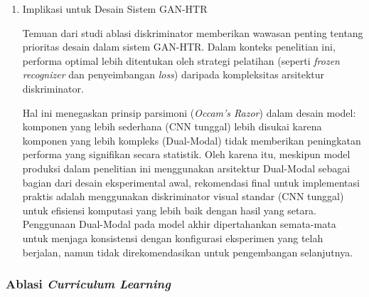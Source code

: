 \documentclass[12pt,a4paper]{article}
\begin{document}
\begin{enumerate}[leftmargin=1.5em, labelsep=0.5em, itemindent=0pt, noitemsep, topsep=0pt]
          Hasil negatif pada pengujian hipotesis diskriminator \textit{dual-modal} memberikan implikasi teoretis bahwa penambahan kompleksitas model melalui integrasi fitur tekstual tidak selalu menjamin peningkatan kualitas restorasi. Temuan ini menggugurkan asumsi bahwa semakin kaya informasi yang diberikan kepada diskriminator (visual + tekstual), semakin baik performa \textit{generator}. Dalam kasus ini, informasi visual terbukti sudah memadai.


          Penelitian masa depan dapat mengeksplorasi strategi pelatihan alternatif seperti \textit{Teacher Forcing} atau \textit{Scheduled Sampling}; dalam pendekatan ini, diskriminator secara berkala diberikan akses ke teks \textit{ground truth} untuk mempelajari representasi tekstual yang lebih baik. Namun, pendekatan ini harus diterapkan dengan hati-hati untuk menghindari risiko dominasi berlebihan diskriminator yang dapat menyebabkan hilangnya gradien bagi generator jika diskriminator menjadi terlalu kuat dibandingkan generator.

    \item Implikasi untuk Desain Sistem GAN-HTR

          Temuan dari studi ablasi diskriminator memberikan wawasan penting tentang prioritas desain dalam sistem GAN-HTR. Dalam konteks penelitian ini, performa optimal lebih ditentukan oleh strategi pelatihan (seperti \textit{frozen recognizer} dan penyeimbangan \textit{loss}) daripada kompleksitas arsitektur diskriminator.

          Hal ini menegaskan prinsip parsimoni (\textit{Occam's Razor}) dalam desain model: komponen yang lebih sederhana (CNN tunggal) lebih disukai karena komponen yang lebih kompleks (Dual-Modal) tidak memberikan peningkatan performa yang signifikan secara statistik. Oleh karena itu, meskipun model produksi dalam penelitian ini menggunakan arsitektur Dual-Modal sebagai bagian dari desain eksperimental awal, rekomendasi final untuk implementasi praktis adalah menggunakan diskriminator visual standar (CNN tunggal) untuk efisiensi komputasi yang lebih baik dengan hasil yang setara. Penggunaan Dual-Modal pada model akhir dipertahankan semata-mata untuk menjaga konsistensi dengan konfigurasi eksperimen yang telah berjalan, namun tidak direkomendasikan untuk pengembangan selanjutnya.
\end{enumerate}

\subsubsection{Ablasi \textit{Curriculum Learning}}
\label{subsubsec:kontribusi-curriculum-learning}
\end{document}
